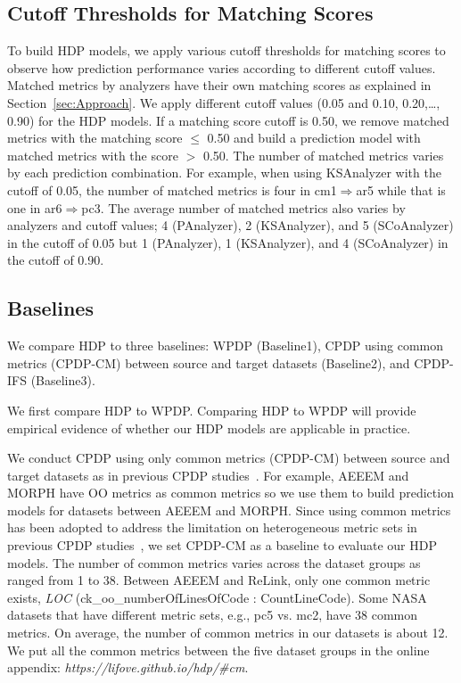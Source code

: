 \subsection{Cutoff Thresholds for Matching Scores}

To build HDP models, we apply
various cutoff thresholds for matching scores to observe how prediction
performance varies according to different cutoff values. Matched metrics
by analyzers have their own matching scores as explained in
Section~\ref{sec:Approach}. We apply different cutoff values (0.05 and 0.10, 0.20,\ldots, 0.90) for the HDP models. If a
matching score cutoff is 0.50, we remove matched metrics with the
matching score $\leq$ 0.50 and build a prediction model with matched metrics
with the score $>$ 0.50. The number of matched metrics varies by each prediction
combination. For example, when using KSAnalyzer with the cutoff of 0.05, the
number of matched metrics is four in cm1$\Rightarrow$ar5 while that is one in
ar6$\Rightarrow$pc3. The average number of matched metrics also varies by
analyzers and cutoff values; 4 (PAnalyzer), 2 (KSAnalyzer), and 5 (SCoAnalyzer)
in the cutoff of 0.05 but 1 (PAnalyzer), 1 (KSAnalyzer), and 4 (SCoAnalyzer) in
the cutoff of 0.90.

\subsection{Baselines}

We compare HDP to three baselines: WPDP (Baseline1), CPDP using common
metrics (CPDP-CM) between source and target datasets (Baseline2), and CPDP-IFS
(Baseline3).

We first compare HDP to WPDP. Comparing HDP
to WPDP will provide empirical evidence of whether our
HDP models are applicable in practice.


We conduct CPDP using only common metrics (CPDP-CM) between
source and target datasets as in previous CPDP
studies~\cite{He14,Ma12,Turhan09}.
For example, AEEEM and MORPH have OO metrics as common metrics so we use them to build prediction
models for datasets between AEEEM and MORPH. Since
using common metrics has been adopted to address the limitation on heterogeneous
metric sets in previous CPDP studies~\cite{He14,Ma12,Turhan09}, we set CPDP-CM
as a baseline to evaluate our HDP models.
The number of common metrics varies across the dataset groups as ranged from 1 to 38. Between
AEEEM and ReLink, only one common metric exists, {\em LOC} (ck\_oo\_numberOfLinesOfCode : CountLineCode).
Some NASA datasets that have different metric sets, e.g., pc5 vs. mc2, have 38 common metrics. On average, the number of common
metrics in our datasets is about 12. We put all the common metrics between the five dataset groups in the online appendix: {\em https://lifove.github.io/hdp/\#cm}.

